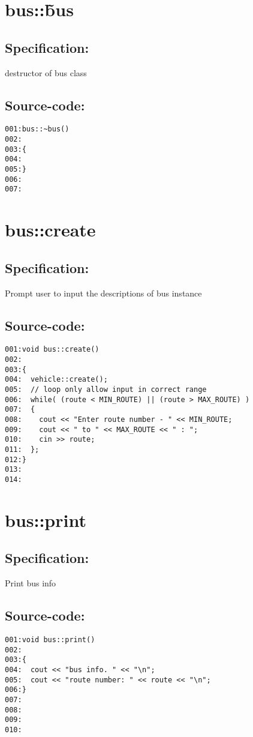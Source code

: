 \section{bus::\~bus}
\subsection*{Specification:}
destructor of bus class
\subsection*{Source-code:}
\begin{verbatim}
001:bus::~bus()
002:
003:{
004:
005:}
006:
007:
\end{verbatim}
\section{bus::create}
\subsection*{Specification:}
Prompt user to input the descriptions of bus instance
\subsection*{Source-code:}
\begin{verbatim}
001:void bus::create()
002:
003:{
004:  vehicle::create(); 
005:  // loop only allow input in correct range
006:  while( (route < MIN_ROUTE) || (route > MAX_ROUTE) )
007:  {
008:    cout << "Enter route number - " << MIN_ROUTE;
009:    cout << " to " << MAX_ROUTE << " : ";
010:    cin >> route;
011:  };
012:}
013:
014:
\end{verbatim}
\section{bus::print}
\subsection*{Specification:}
Print bus info
\subsection*{Source-code:}
\begin{verbatim}
001:void bus::print()
002:
003:{
004:  cout << "bus info. " << "\n";
005:  cout << "route number: " << route << "\n";
006:}
007:
008:
009:
010:
\end{verbatim}
